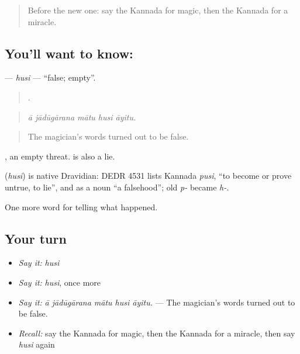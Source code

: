 \label{lesson:KA-C374-husi}



\begin{quote}
Before the new one: say the Kannada for magic, then the Kannada for a miracle.
\end{quote}

\subsection*{You'll want to know: }
\textbf{} — \emph{husi} — \textquotedblleft{}false; empty\textquotedblright{}.

\begin{quote}
    .
\end{quote}

\begin{quote}
\emph{ā jādūgārana mātu husi āyitu.}
\end{quote}

\begin{quote}
The magician's words turned out to be false.
\end{quote}

 , an empty threat.  is also a lie.

\begin{cousinweb}
\textbf{} (\emph{husi}) is native Dravidian: DEDR 4531 lists Kannada \emph{pusi}, \textquotedblleft{}to become or prove untrue, to lie\textquotedblright{}, and as a noun \textquotedblleft{}a falsehood\textquotedblright{}; old \emph{p-} became \emph{h-}.
\end{cousinweb}

\begin{grammarlens}[title={What you've built}]
One more word for telling what happened.
\end{grammarlens}

\subsection*{Your turn}
\begin{itemize}
\raggedright
  \item \emph{Say it:} \emph{husi}
  \item \emph{Say it:} \emph{husi}, once more
  \item \emph{Say it:} \emph{ā jādūgārana mātu husi āyitu.} — The magician's words turned out to be false.
  \item \emph{Recall:} say the Kannada for magic, then the Kannada for a miracle, then say \emph{husi} again
\end{itemize}

